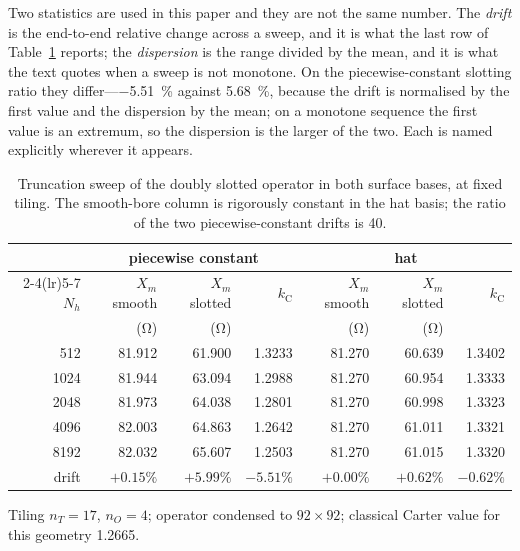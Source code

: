 \documentclass[10pt,a4paper,twocolumn]{article}
\theoremstyle{plain}
\theoremstyle{remark}
\begin{document}
Two statistics are used in this paper and they are not the same number.
The \emph{drift} is the end-to-end relative change across a sweep, and
it is what the last row of Table~\ref{tab:kc} reports; the
\emph{dispersion} is the range divided by the mean, and it is what the
text quotes when a sweep is not monotone. On the piecewise-constant
slotting ratio they differ---\SI{-5.51}{\percent} against
\SI{5.68}{\percent}, because the drift is normalised by the first
value and the dispersion by the mean; on a monotone sequence the first
value is an extremum, so the dispersion is the larger of the two. Each
is named explicitly wherever it appears.

\begin{table}[!t]
\centering
\begin{threeparttable}
\footnotesize
\begin{tabular}{rrrrrrr}
\toprule
& \multicolumn{3}{c}{piecewise constant} & \multicolumn{3}{c}{hat}\\
\cmidrule(lr){2-4}\cmidrule(lr){5-7}
$N_h$ & $X_m$ smooth & $X_m$ slotted & $k_{\mathrm{C}}$
      & $X_m$ smooth & $X_m$ slotted & $k_{\mathrm{C}}$\\
      & (\si{\ohm}) & (\si{\ohm}) & & (\si{\ohm}) & (\si{\ohm}) & \\
\midrule
\num{512}  & \num{81.912} & \num{61.900} & \num{1.3233} & \num{81.270} & \num{60.639} & \num{1.3402}\\
\num{1024} & \num{81.944} & \num{63.094} & \num{1.2988} & \num{81.270} & \num{60.954} & \num{1.3333}\\
\num{2048} & \num{81.973} & \num{64.038} & \num{1.2801} & \num{81.270} & \num{60.998} & \num{1.3323}\\
\num{4096} & \num{82.003} & \num{64.863} & \num{1.2642} & \num{81.270} & \num{61.011} & \num{1.3321}\\
\num{8192} & \num{82.032} & \num{65.607} & \num{1.2503} & \num{81.270} & \num{61.015} & \num{1.3320}\\
\midrule
drift & $+0.15\%$ & $+5.99\%$ & $-5.51\%$ & $+0.00\%$ & $+0.62\%$ & $-0.62\%$\\
\bottomrule
\end{tabular}
\begin{tablenotes}[flushleft]\footnotesize
\item Tiling $n_T=17$,
$n_O=4$; operator condensed to $92\times92$; classical Carter value for
this geometry \num{1.2665}.
\end{tablenotes}
\end{threeparttable}
\caption{Truncation sweep of the doubly slotted operator in both surface
bases, at fixed tiling. The smooth-bore column is rigorously constant in
the hat basis; the ratio of the two piecewise-constant drifts is
\num{40}.}
\label{tab:kc}
\end{table}
\end{document}
